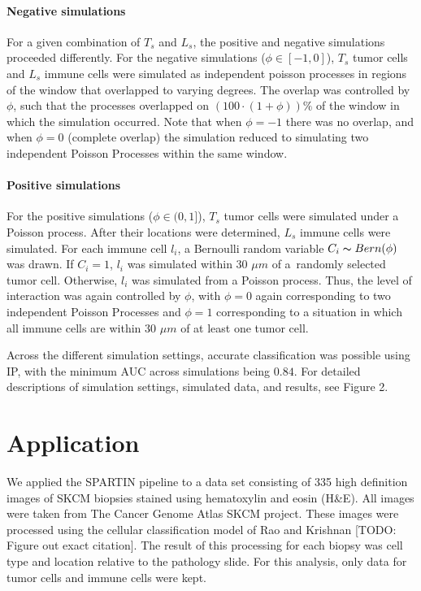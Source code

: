 \documentclass[
]{book}
\begin{document}
\paragraph{\textbf{Negative simulations}}

For a given combination of \(T_s\) and \(L_s\), the positive and
negative simulations proceeded differently. For the negative
simulations (\(\phi \in [-1, 0]\)), \(T_s\) tumor cells and \(L_s\)
immune cells were simulated as independent poisson processes in
regions of the window that overlapped to varying degrees. The
overlap was controlled by \(\phi\), such that the processes
overlapped on \((100 \cdot (1 + \phi)) \%\) of the window in which
the simulation occurred. Note that when \(\phi = -1\) there was no
overlap, and when \(\phi = 0\) (complete overlap) the simulation
reduced to simulating two independent Poisson Processes within
the same window.

\paragraph{\textbf{Positive simulations}}

For the positive simulations (\(\phi \in (0, 1]\)), \(T_s\) tumor
cells were simulated under a Poisson process. After their
locations were determined, \(L_s\) immune cells were simulated. For
each immune cell \(l_i\), a Bernoulli random variable
\(C_i \thicksim Bern(\phi)\) was drawn. If \(C_i = 1\), \(l_i\) was
simulated within \(30\) \(\mu m\) of a~randomly selected tumor cell. Otherwise, \(l_i\) was simulated from a Poisson process.
Thus, the level of interaction was again controlled by \(\phi\), with
\(\phi = 0\) again corresponding to two independent Poisson Processes and
\(\phi = 1\) corresponding to a situation in which all immune cells are
within \(30\) \(\mu m\) of at least one tumor cell.

Across the different simulation settings, accurate classification
was possible using IP, with the minimum AUC across simulations
being \(0.84\). For detailed descriptions of simulation settings,
simulated data, and results, see Figure 2.

\hypertarget{application}{%
\section{Application}\label{application}}

We applied the SPARTIN pipeline to a data set consisting of 335 high definition images of SKCM biopsies stained using hematoxylin and eosin (H\&E). All images were taken from The Cancer Genome Atlas SKCM project. These images were processed using the cellular classification model of Rao and Krishnan {[}TODO: Figure out exact citation{]}. The result of this processing for each biopsy was cell type and location relative to the pathology slide. For this analysis, only data for tumor cells and immune cells were kept.
\end{document}

